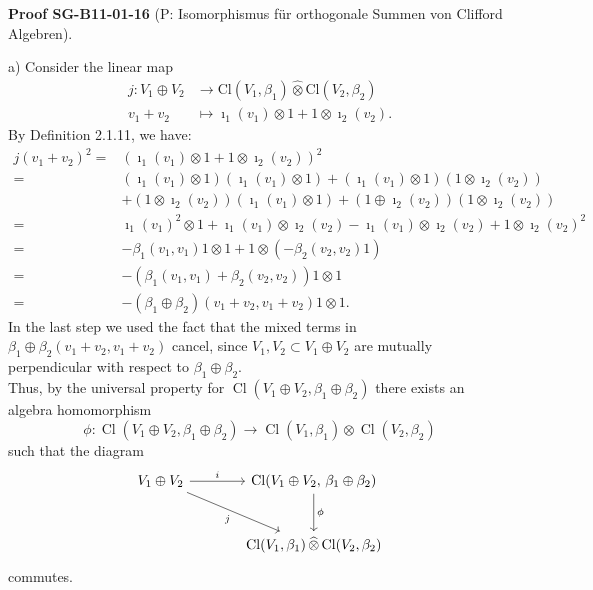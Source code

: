 \documentclass[10pt, letterpaper]{article}
\newcommand{\CustomHeading}[3]{%
  \par\medskip\noindent%
  \textbf{#1 #2} \textnormal{(#3)}.\enskip%
}
\newenvironment{PROOF}[2]{\begin{unitbox}\CustomHeading{Proof}{#1}{#2}}{\end{unitbox}}
\begin{document}
\begin{PROOF}{SG-B11-01-16}{P: Isomorphismus für orthogonale Summen von Clifford Algebren}
a) Consider the linear map
$$
\begin{aligned}
j: V_{1} \oplus V_{2} & \rightarrow \mathrm{Cl}\left(V_{1}, \beta_{1}\right) \hat{\otimes} \mathrm{Cl}\left(V_{2}, \beta_{2}\right) \\
v_{1}+v_{2} & \mapsto \imath_{1}\left(v_{1}\right) \otimes 1+1 \otimes \imath_{2}\left(v_{2}\right) .
\end{aligned}
$$
By Definition 2.1.11, we have:
$$
\begin{aligned}
j\left(v_{1}+v_{2}\right)^{2}= & \left(\imath_{1}\left(v_{1}\right) \otimes 1+1 \otimes \imath_{2}\left(v_{2}\right)\right)^{2} \\
= & \left(\imath_{1}\left(v_{1}\right) \otimes 1\right)\left(\imath_{1}\left(v_{1}\right) \otimes 1\right)+\left(\imath_{1}\left(v_{1}\right) \otimes 1\right)\left(1 \otimes \imath_{2}\left(v_{2}\right)\right) \\
& +\left(1 \otimes \imath_{2}\left(v_{2}\right)\right)\left(\imath_{1}\left(v_{1}\right) \otimes 1\right)+\left(1 \oplus \imath_{2}\left(v_{2}\right)\right)\left(1 \otimes \imath_{2}\left(v_{2}\right)\right) \\
= & \imath_{1}\left(v_{1}\right)^{2} \otimes 1+\imath_{1}\left(v_{1}\right) \otimes \imath_{2}\left(v_{2}\right)-\imath_{1}\left(v_{1}\right) \otimes \imath_{2}\left(v_{2}\right)+1 \otimes \imath_{2}\left(v_{2}\right)^{2} \\
= & -\beta_{1}\left(v_{1}, v_{1}\right) 1 \otimes 1+1 \otimes\left(-\beta_{2}\left(v_{2}, v_{2}\right) 1\right) \\
= & -\left(\beta_{1}\left(v_{1}, v_{1}\right)+\beta_{2}\left(v_{2}, v_{2}\right)\right) 1 \otimes 1 \\
= & -\left(\beta_{1} \oplus \beta_{2}\right)\left(v_{1}+v_{2}, v_{1}+v_{2}\right) 1 \otimes 1 .
\end{aligned}
$$
In the last step we used the fact that the mixed terms in $\beta_{1} \oplus \beta_{2}\left(v_{1}+v_{2}, v_{1}+v_{2}\right)$ cancel, since $V_{1}, V_{2} \subset V_{1} \oplus V_{2}$ are mutually perpendicular with respect to $\beta_{1} \oplus \beta_{2}$.\\
Thus, by the universal property for $\operatorname{Cl}\left(V_{1} \oplus V_{2}, \beta_{1} \oplus \beta_{2}\right)$ there exists an algebra homomorphism
$$
\phi: \operatorname{Cl}\left(V_{1} \oplus V_{2}, \beta_{1} \oplus \beta_{2}\right) \rightarrow \operatorname{Cl}\left(V_{1}, \beta_{1}\right) \hat{\otimes} \operatorname{Cl}\left(V_{2}, \beta_{2}\right)
$$
such that the diagram
\[
\begin{tikzcd}[row sep=large, column sep=large]
V_1 \oplus V_2 \arrow[r, "i"] \arrow[dr, "j"'] &
\mathrm{Cl}(V_1 \oplus V_2,\, \beta_1 \oplus \beta_2)
\arrow[d, "\phi"] \\
& \mathrm{Cl}(V_1, \beta_1) \,\widehat{\otimes}\, \mathrm{Cl}(V_2, \beta_2)
\end{tikzcd}
\]
commutes.




\end{PROOF}
\end{document}
